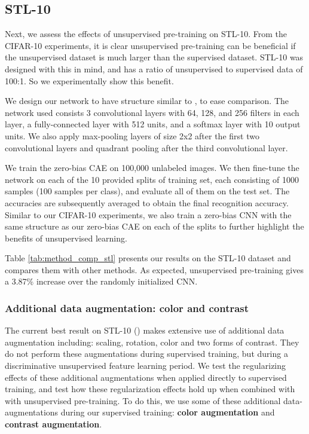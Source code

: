 \documentclass{article} \usepackage{iclr2015,times}
\begin{document}
\subsection{STL-10}

Next, we assess the effects of unsupervised pre-training on STL-10. From the CIFAR-10 experiments, it is clear unsupervised pre-training can be beneficial if the unsupervised dataset is much larger than the supervised dataset. STL-10 was designed with this in mind, and has a ratio of unsupervised to supervised data of 100:1. So we experimentally show this benefit. 

We design our network to have structure similar to \citet{dosovitskiy2014discriminative}, to ease comparison. The network used consists 3 convolutional layers with 64, 128, and 256 filters in each layer, a fully-connected layer with 512 units, and a softmax layer with 10 output units. We also apply max-pooling layers of size 2x2 after the first two convolutional layers and quadrant pooling after the third convolutional layer.

We train the zero-bias CAE on 100,000 unlabeled images. We then fine-tune the network on each of the 10 provided splits of training set, each consisting of 1000 samples (100 samples per class), and evaluate all of them on the test set. The accuracies are subsequently averaged to obtain the final recognition accuracy. Similar to our CIFAR-10 experiments, we also train a zero-bias CNN with the same structure as our zero-bias CAE on each of the splits to further highlight the benefits of unsupervised learning.

Table \ref{tab:method_comp_stl} presents our results on the STL-10 dataset and compares them with other methods. As expected, unsupervised pre-training gives a 3.87\% increase over the randomly initialized CNN.


\subsubsection{Additional data augmentation: color and contrast}
The current best result on STL-10 (\citet{dosovitskiy2014discriminative}) makes extensive use of additional data augmentation including: scaling, rotation, color and two forms of contrast. They do not perform these augmentations during supervised training, but during a discriminative unsupervised feature learning period. We test the regularizing effects of these additional augmentations when applied directly to supervised training, and test how these regularization effects hold up when combined with with unsupervised pre-training. To do this, we use some of these additional data-augmentations during our supervised training: \textbf{color augmentation} and \textbf{contrast augmentation}.
\end{document}
